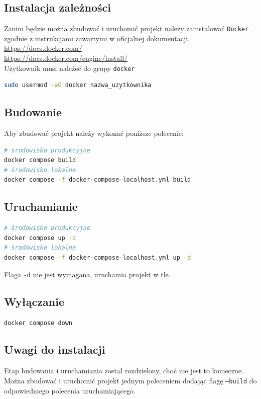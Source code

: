 \documentclass[shortabstract]{iithesis}
\begin{document}
\subsection{Instalacja zależności}
Zanim będzie można zbudować i uruchomić projekt należy zainstalować \texttt{Docker} zgodnie z instrukcjami zawartymi w oficjalnej dokumentacji.
\\
\url{https://docs.docker.com/}
\\
\url{https://docs.docker.com/engine/install/}
\\
Użytkownik musi należeć do grupy \texttt{docker}

\begin{lstlisting}[language=bash]
sudo usermod -aG docker nazwa_uzytkownika
\end{lstlisting}

\subsection{Budowanie}
\noindent
Aby zbudować projekt należy wykonać poniższe polecenie:

\begin{lstlisting}[language=bash]
# środowisko produkcyjne
docker compose build
# środowisko lokalne
docker compose -f docker-compose-localhost.yml build
\end{lstlisting}

\subsection{Uruchamianie}
\begin{lstlisting}[language=bash]
# środowisko produkcyjne
docker compose up -d
# środowisko lokalne
docker compose -f docker-compose-localhost.yml up -d
\end{lstlisting}
Flaga \texttt{-d} nie jest wymagana, uruchamia projekt w tle.

\subsection{Wyłączanie}
\begin{lstlisting}[language=bash]
docker compose down
\end{lstlisting}

\subsection{Uwagi do instalacji}
Etap budowania i uruchamiania został rozdzielony, choć nie jest to konieczne.
Można zbudować i uruchomić projekt jednym poleceniem dodając flagę \texttt{--build} do odpowiedniego polecenia uruchamiającego.
\end{document}
